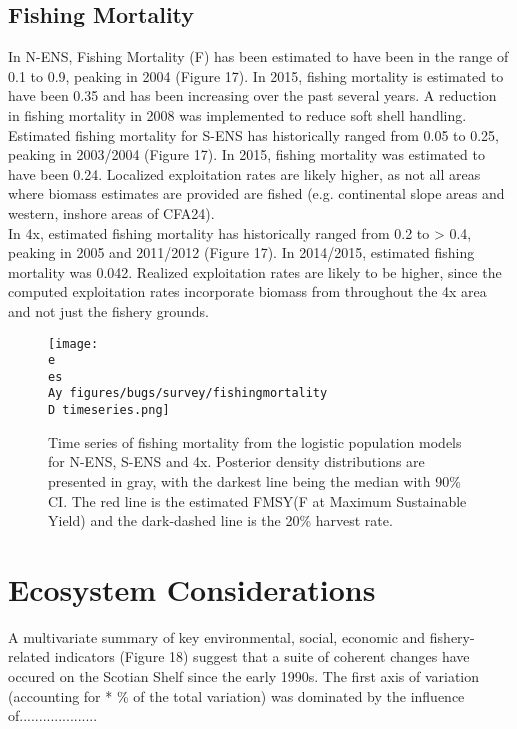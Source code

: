 \documentclass[paper=a4, fontsize=11pt]{article}
\newcommand{\D}{.}
\newcommand{\e}{/home/michelle/ecomod_data/}
\newcommand{\es}{snowcrab/}
\newcommand{\Ay}{assessments/2015/}
\begin{document}
\subsection{Fishing Mortality}

In N-ENS, Fishing Mortality (F) has been estimated to have been in the range of 0.1 to 0.9, peaking in 2004 (Figure 17). In 2015, fishing mortality is estimated to have been 0.35 and has been increasing over the past several years. A reduction in fishing mortality in 2008 was implemented to reduce soft shell handling.\\

Estimated fishing mortality for S-ENS has historically ranged from 0.05 to 0.25, peaking in 2003/2004 (Figure 17). In 2015, fishing mortality was estimated to have been 0.24. Localized exploitation rates are likely higher, as not all areas where biomass estimates are provided are fished (e.g. continental slope areas and western, inshore areas of CFA24).\\

In 4x, estimated fishing mortality has historically ranged from 0.2 to > 0.4, peaking in 2005 and 2011/2012 (Figure 17). In 2014/2015, estimated fishing mortality was 0.042. Realized exploitation rates are likely to be higher, since the computed exploitation rates incorporate biomass from throughout the 4x area and not just the fishery grounds.

\begin{figure}[ht]
    \centering
    \texttt{[image: \\e \\es \\Ay figures/bugs/survey/fishingmortality\\D timeseries.png]}
    \caption{Time series of fishing mortality from the logistic population models for N-ENS, S-ENS and 4x. Posterior density distributions are presented in gray, with the darkest line being the median with 90\% CI. The red line is the estimated FMSY(F at Maximum Sustainable Yield) and the dark-dashed line is the 20\% harvest rate.}
\end{figure}
\clearpage

\section{Ecosystem Considerations}
A multivariate summary of key environmental, social, economic and fishery-related indicators (Figure 18) suggest that a suite of coherent changes have occured on the Scotian Shelf since the early 1990s. The first axis of variation (accounting for * \% of the total variation) was dominated by the influence of....................
\end{document}
